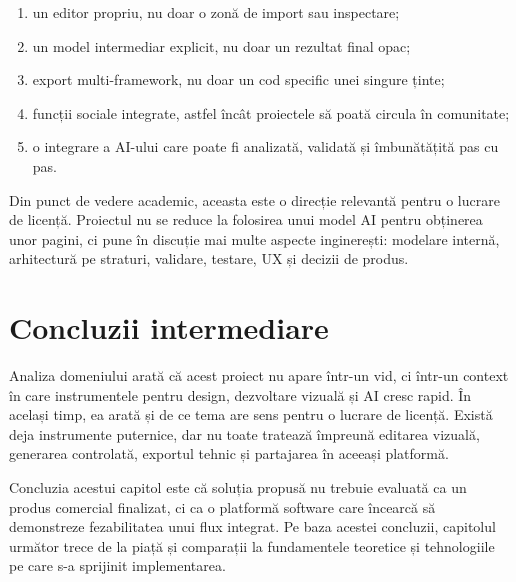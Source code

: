 \begin{enumerate}[leftmargin=1.5cm]
  \item un editor propriu, nu doar o zonă de import sau inspectare;
  \item un model intermediar explicit, nu doar un rezultat final opac;
  \item export multi-framework, nu doar un cod specific unei singure ținte;
  \item funcții sociale integrate, astfel încât proiectele să poată circula în comunitate;
  \item o integrare a AI-ului care poate fi analizată, validată și îmbunătățită pas cu pas.
\end{enumerate}

Din punct de vedere academic, aceasta este o direcție relevantă pentru o lucrare de licență. Proiectul nu se reduce la folosirea unui model AI pentru obținerea unor pagini, ci pune în discuție mai multe aspecte inginerești: modelare internă, arhitectură pe straturi, validare, testare, UX și decizii de produs.

\section{Concluzii intermediare}

Analiza domeniului arată că acest proiect nu apare într-un vid, ci într-un context în care instrumentele pentru design, dezvoltare vizuală și AI cresc rapid. În același timp, ea arată și de ce tema are sens pentru o lucrare de licență. Există deja instrumente puternice, dar nu toate tratează împreună editarea vizuală, generarea controlată, exportul tehnic și partajarea în aceeași platformă.

Concluzia acestui capitol este că soluția propusă nu trebuie evaluată ca un produs comercial finalizat, ci ca o platformă software care încearcă să demonstreze fezabilitatea unui flux integrat. Pe baza acestei concluzii, capitolul următor trece de la piață și comparații la fundamentele teoretice și tehnologiile pe care s-a sprijinit implementarea.
